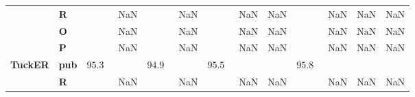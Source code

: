 \begin{tabular}{llrrrrrrr}
       & \textbf{R} &                         NaN &                         NaN &                         NaN &         NaN &                         NaN &                                        NaN &      NaN \\
       & \textbf{O} &                         NaN &                         NaN &                         NaN &         NaN &                         NaN &                                        NaN &      NaN \\
       & \textbf{P} &                         NaN &                         NaN &                         NaN &         NaN &                         NaN &                                        NaN &      NaN \\\midrule
\textbf{TuckER} & \textbf{pub} &  $95.3\phantom{0 \pm 0.00}$ &  $94.9\phantom{0 \pm 0.00}$ &  $95.5\phantom{0 \pm 0.00}$ &             &  $95.8\phantom{0 \pm 0.00}$ &                                            &          \\
       & \textbf{R} &                         NaN &                         NaN &                         NaN &         NaN &                         NaN &                                        NaN &      NaN \\
\bottomrule
\end{tabular}

